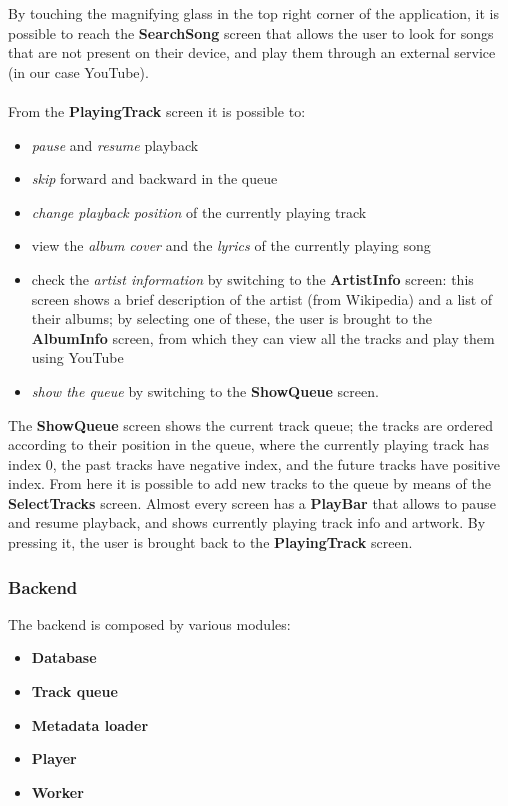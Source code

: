 \documentclass{article}
\begin{document}
By touching the magnifying glass in the top right corner of the application, it
is possible to reach the \textbf{SearchSong} screen that allows the user to look
for songs that are not present on their device, and play them through an
external service (in our case YouTube).
\\\\
From the \textbf{PlayingTrack} screen it is possible to:
\begin{itemize}
    \item \textit{pause} and \textit{resume} playback
    \item \textit{skip} forward and backward in the queue
    \item \textit{change playback position} of the currently playing track
    \item view the \textit{album cover} and the \textit{lyrics} of the currently
        playing song
    \item check the \textit{artist information} by switching to the
        \textbf{ArtistInfo} screen: this screen shows a brief description of the
        artist (from Wikipedia) and a list of their albums; by selecting one of
        these, the user is brought to the \textbf{AlbumInfo} screen, from which 
        they can view all the tracks and play them using YouTube
    \item \textit{show the queue} by switching to the \textbf{ShowQueue} screen.

\end{itemize}

The \textbf{ShowQueue} screen shows the current track queue; the tracks are
ordered according to their position in the queue, where the currently playing
track has index 0, the past tracks have negative index, and the future tracks
have positive index. From here it is possible to add new tracks to the queue by
means of the \textbf{SelectTracks} screen. Almost every screen has a
\textbf{PlayBar} that allows to pause and resume playback, and shows currently
playing track info and artwork. By pressing it, the user is brought back to the
\textbf{PlayingTrack} screen.

\subsubsection{Backend}
The backend is composed by various modules:
\begin{itemize}
    \item \textbf{Database}
    \item \textbf{Track queue}
    \item \textbf{Metadata loader}
    \item \textbf{Player}
    \item \textbf{Worker}
\end{itemize}
\end{document}
